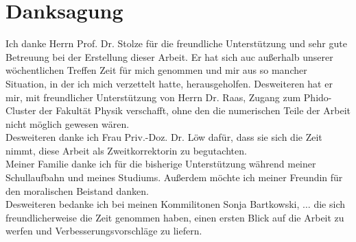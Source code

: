\chapter*{Danksagung}
Ich danke Herrn Prof. Dr. Stolze für die freundliche Unterstützung und sehr gute Betreuung bei der Erstellung dieser Arbeit. Er hat sich auc außerhalb unserer wöchentlichen Treffen Zeit für mich genommen und mir aus so mancher Situation, in der ich mich verzettelt hatte, herausgeholfen. Desweiteren hat er mir, mit freundlicher Unterstützung von Herrn Dr. Raas, Zugang zum Phido-Cluster der Fakultät Physik verschafft, ohne den die numerischen Teile der Arbeit nicht möglich gewesen wären.\\
Desweiteren danke ich Frau Priv.-Doz. Dr. Löw dafür, dass sie sich die Zeit nimmt, diese Arbeit als Zweitkorrektorin zu begutachten. \\
Meiner Familie danke ich für die bisherige Unterstützung während meiner Schullaufbahn und meines Studiums. Außerdem möchte ich meiner Freundin für den moralischen Beistand danken. \\
Desweiteren bedanke ich bei meinen Kommilitonen Sonja Bartkowski, $\dots$ die sich freundlicherweise die Zeit genommen haben, einen ersten Blick auf die Arbeit zu werfen und Verbesserungsvorschläge zu liefern.
\thispagestyle{empty}

